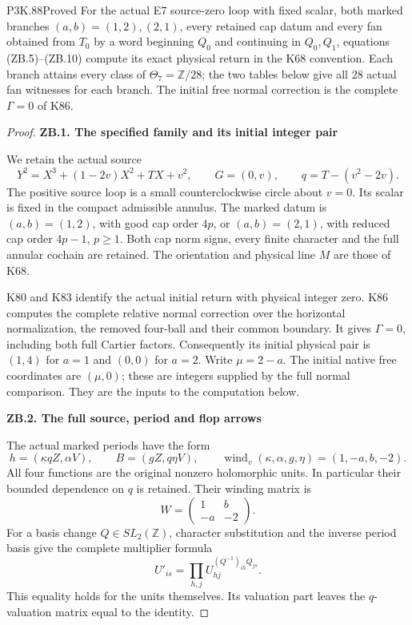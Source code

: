 \begin{statement}{P3K.88}{Proved}
For the actual E7 source-zero loop with fixed scalar, both marked
branches \((a,b)=(1,2),(2,1)\), every retained cap datum and every fan
obtained from \(T_0\) by a word beginning \(Q_0\) and continuing in
\(Q_0,Q_1\), equations (ZB.5)--(ZB.10) compute its exact physical
return in the K68 convention. Each branch attains every class of
\(\Theta_7=\mathbb Z/28\); the two tables below give all 28 actual
fan witnesses for each branch. The initial free normal correction
is the complete \(\Gamma=0\) of K86.
\end{statement}
\begin{proof}
\par

\medskip\noindent\textbf{ZB.1. The specified family and its initial integer pair}

\par\nopagebreak[4]

We retain the actual source
\[
Y^2=X^3+(1-2v)X^2+TX+v^2,\qquad G=(0,v),\qquad
q=T-(v^2-2v).
\]
The positive source loop is a small counterclockwise circle about
\(v=0\). Its scalar is fixed in the compact admissible annulus. The
marked datum is \((a,b)=(1,2)\), with good cap order \(4p\), or
\((a,b)=(2,1)\), with reduced cap order \(4p-1\), \(p\ge1\).
Both cap norm signs, every finite character and the full annular cochain
are retained. The orientation and physical line \(M\) are those of K68.

K80 and K83 identify the actual initial return with physical integer
zero. K86 computes the complete relative normal correction over the
horizontal normalization, the removed four-ball and their common
boundary. It gives \(\Gamma=0\), including both full Cartier factors.
Consequently its initial physical pair is \((1,4)\) for \(a=1\) and
\((0,0)\) for \(a=2\). Write \(\mu=2-a\). The initial native free
coordinates are \((\mu,0)\); these are integers supplied by the full
normal comparison. They are the inputs to the computation below.

\par

\medskip\noindent\textbf{ZB.2. The full source, period and flop arrows}

\par\nopagebreak[4]

The actual marked periods have the form
\[
h=(\kappa qZ,\alpha V),\qquad B=(gZ,q\eta V),
\qquad
\operatorname{wind}_v(\kappa,\alpha,g,\eta)=(1,-a,b,-2).
\]
All four functions are the original nonzero holomorphic units. In
particular their bounded dependence on \(q\) is retained. Their winding
matrix is
\[
W=\begin{pmatrix}1&b\\-a&-2\end{pmatrix}.
\]
For a basis change \(Q\in SL_2(\mathbb Z)\), character substitution
and the inverse period basis give the complete multiplier formula
\[
U'_{is}=\prod_{h,j}U_{hj}^{(Q^{-1})_{ih}Q_{js}}.             \tag{ZB.1}
\]
This equality holds for the units themselves. Its valuation part leaves
the \(q\)-valuation matrix equal to the identity.


\end{proof}
